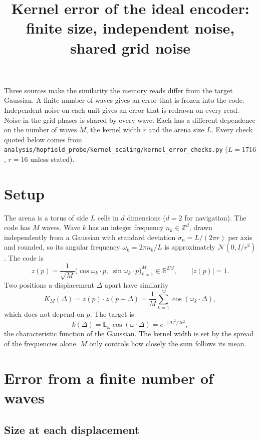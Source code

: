 \documentclass[11pt]{article}
\title{Kernel error of the ideal encoder:\\finite size, independent noise, shared grid noise}
\author{}
\date{}
\newcommand{\E}{\mathbb{E}}
\begin{document}
\maketitle

\noindent Three sources make the similarity the memory reads differ from the target Gaussian.
A finite number of waves gives an error that is frozen into the code. Independent noise on each
unit gives an error that is redrawn on every read. Noise in the grid phases is shared by every
wave. Each has a different dependence on the number of waves $M$, the kernel width $r$ and the
arena size $L$. Every check quoted below comes from
\texttt{analysis/hopfield\_probe/kernel\_scaling/kernel\_error\_checks.py} ($L = 1716$, $r = 16$
unless stated).

\section{Setup}

The arena is a torus of side $L$ cells in $d$ dimensions ($d = 2$ for navigation). The code has
$M$ waves. Wave $k$ has an integer frequency $n_k \in \mathbb{Z}^d$, drawn independently from a
Gaussian with standard deviation $\sigma_n = L/(2\pi r)$ per axis and rounded, so its angular
frequency $\omega_k = 2\pi n_k/L$ is approximately $\mathcal{N}(0, I/r^2)$. The code is
\begin{equation}
  z(p) = \frac{1}{\sqrt{M}}\bigl(\cos\omega_k\!\cdot p,\; \sin\omega_k\!\cdot p\bigr)_{k=1}^{M}
  \in \mathbb{R}^{2M}, \qquad |z(p)| = 1 .
\end{equation}
Two positions a displacement $\Delta$ apart have similarity
\begin{equation}
  K_M(\Delta) = z(p)\cdot z(p+\Delta) = \frac{1}{M}\sum_{k=1}^{M}\cos(\omega_k\!\cdot\Delta),
\end{equation}
which does not depend on $p$. The target is
\begin{equation}
  k(\Delta) = \E_\omega\cos(\omega\cdot\Delta) = e^{-|\Delta|^2/2r^2},
\end{equation}
the characteristic function of the Gaussian. The kernel width is set by the spread of the
frequencies alone. $M$ only controls how closely the sum follows its mean.

\section{Error from a finite number of waves}

\subsection{Size at each displacement}
\end{document}
